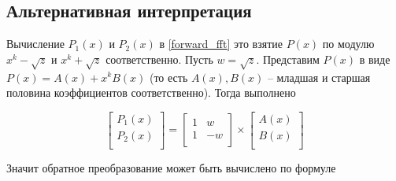 \subsection{Альтернативная интерпретация}


Вычисление $P_1(x)$ и $P_2(x)$ в \ref{forward_fft} это взятие $P(x)$ по модулю $x^k - \sqrt{z}$ и $x^k + \sqrt{z}$ соответственно.
Пусть $w = \sqrt{z}$.
Представим $P(x)$ в виде $P(x) = A(x) + x^k B(x)$ (то есть $A(x), B(x)$ -- младшая и старшая половина коэффициентов соответственно).
Тогда выполнено

\begin{@empty}
    \renewcommand*{\arraystretch}{1.7}

    \begin{equation}
        \begin{bmatrix}
            P_1(x) \\
            P_2(x) \\
        \end{bmatrix}
        =
        \begin{bmatrix}
            1 & w  \\
            1 & -w \\
        \end{bmatrix}
        \times
        \begin{bmatrix}
            A(x) \\
            B(x) \\
        \end{bmatrix}
    \end{equation}
\end{@empty}

Значит обратное преобразование может быть вычислено по формуле


